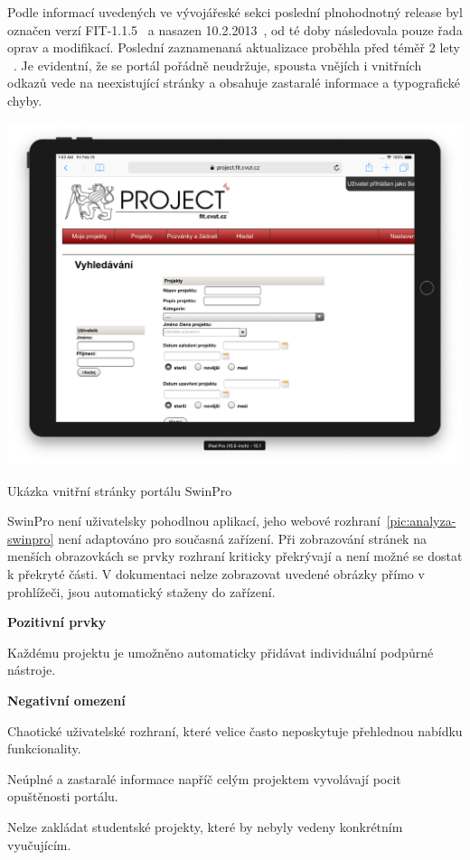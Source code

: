 Podle informací uvedených ve vývojářeské sekci poslední plnohodnotný release byl označen verzí FIT-1.1.5~\cite{swinproDevpage} a nasazen 10.2.2013~\cite{swinproDevpage1645}, od té doby následovala pouze řada oprav a modifikací. Poslední zaznamenaná aktualizace proběhla před téměř 2 lety ~\cite{swinproDevpage1907}. Je evidentní, že se portál pořádně neudržuje, spousta vnějích i vnitřních odkazů vede na neexistující stránky a obsahuje zastaralé informace a typografické chyby.


\begin{fig:illustration}
   \includegraphics[width=1\textwidth]{images/analyza-swinpro.png}
   \caption{Ukázka vnitřní stránky portálu SwinPro}\label{pic:analyza-swinpro}
\end{fig:illustration}

SwinPro není uživatelsky pohodlnou aplikací, jeho webové rozhraní~\ref{pic:analyza-swinpro} není adaptováno pro současná zařízení. Při zobrazování stránek na menších obrazovkách se prvky rozhraní kriticky překrývají a není možné se dostat k překryté části. V dokumentaci nelze zobrazovat uvedené obrázky přímo v prohlížeči, jsou automatický staženy do zařízení.

\textbf{Pozitivní prvky}

\begin{ul}
   \item
   Každému projektu je umožněno automaticky přidávat individuální podpůrné nástroje.
\end{ul}

\textbf{Negativní omezení}

\begin{ul}
   \item
   Chaotické uživatelské rozhraní, které velice často neposkytuje přehlednou nabídku funkcionality.
   \item
   Neúplné a zastaralé informace napříč celým projektem vyvolávají pocit opuštěnosti portálu.
   \item
   Nelze zakládat studentské projekty, které by nebyly vedeny konkrétním vyučujícím.
\end{ul}




